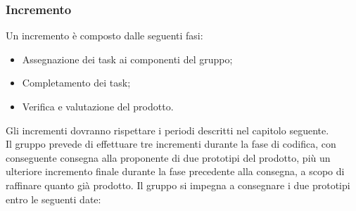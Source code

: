 \subsubsection{Incremento}\label{inc}
Un incremento è composto dalle seguenti fasi:
\begin{itemize}
	\item Assegnazione dei task ai componenti del gruppo;
	\item Completamento dei task;
	\item Verifica e valutazione del prodotto.
\end{itemize}
Gli incrementi dovranno rispettare i periodi descritti nel capitolo seguente.\\
Il gruppo prevede di effettuare tre incrementi durante la fase di codifica, con conseguente consegna alla proponente di due prototipi del prodotto, più un ulteriore incremento finale durante la fase precedente alla consegna, a scopo di raffinare quanto già prodotto.
Il gruppo si impegna a consegnare i due prototipi entro le seguenti date:
